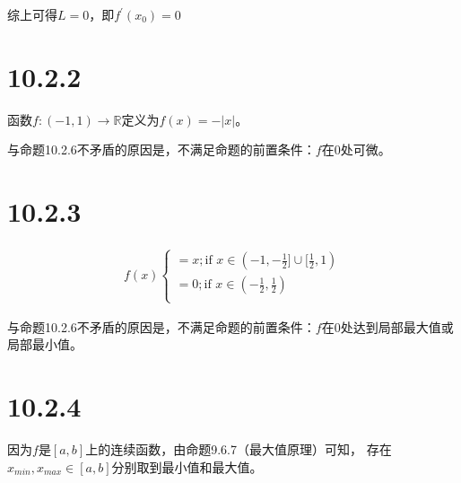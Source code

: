 \documentclass{article}
\begin{document}
综上可得$L = 0$，即$f^\prime(x_0) = 0$

\section*{10.2.2}

函数$f: (-1, 1) \to \mathbb{R}$定义为$f(x) = -|x|$。

与命题10.2.6不矛盾的原因是，不满足命题的前置条件：$f$在$0$处可微。

\section*{10.2.3}

\begin{align*}
  f(x)
  \begin{cases*}
    = x; \text{if } x \in (-1, -\frac{1}{2}] \cup [\frac{1}{2}, 1) \\
    = 0; \text{if } x \in (-\frac{1}{2}, \frac{1}{2})              \\
  \end{cases*}
\end{align*}

与命题10.2.6不矛盾的原因是，不满足命题的前置条件：$f$在$0$处达到局部最大值或局部最小值。

\section*{10.2.4}

因为$f$是$[a, b]$上的连续函数，由命题9.6.7（最大值原理）可知，
存在$x_{min}, x_{max} \in [a, b]$分别取到最小值和最大值。
\end{document}
